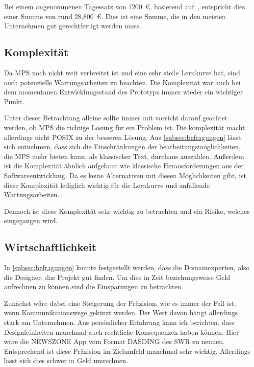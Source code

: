Bei einem angenommenen Tagessatz von 1200~\euro, basierend auf~\cite{metrics-germany-gmbh-2021}, entspricht dies einer Summe von rund 28,800~\euro.
Dies ist eine Summe, die in den meisten Unternehmen gut gerechtfertigt werden muss.

\subsection{Komplexität}\label{subsec:komplexitat}
Da \ac{MPS} noch nicht weit verbreitet ist und eine sehr steile Lernkurve hat, sind auch potenzielle Wartungsarbeiten zu beachten.
Die Komplexität war auch bei dem momentanen Entwicklungsstand des Prototyps immer wieder ein wichtiger Punkt.

Unter dieser Betrachtung alleine sollte immer mit vorsicht darauf geachtet werden, ob \ac{MPS} die richtige Lösung für ein Problem ist.
Die komplexität macht allerdings nicht \ac{POSIX} zu der besseren Lösung.
Aus \autoref{subsec:befragungen} lässt sich entnehmen, dass sich die Einschränkungen der bearbeitungsmöglichkeiten, die \ac{MPS} mehr bieten kann, als klassischer Text, durchaus auszahlen.
Außerdem ist die Komplexität ähnlich aufgebaut wie klassische Herausforderungen aus der Softwareentwicklung.
Da es keine Alternativen mit diesen Möglichkeiten gibt, ist diese Komplexität lediglich wichtig für die Lernkurve und anfallende Wartungsarbeiten.

Dennoch ist diese Komplexität sehr wichtig zu betrachten und ein Risiko, welches eingegangen wird.

\subsection{Wirtschaftlichkeit}\label{subsec:wirtschaftlichkeit}
In \autoref{subsec:befragungen} konnte festgestellt werden, dass die Domainexperten, also die Designer, das Projekt gut finden.
Um dies in Zeit beziehungsweise Geld aufrechnen zu können sind die Einsparungen zu betrachten.

Zunächst wäre dabei eine Steigerung der Präzision, wie es immer der Fall ist, wenn Kommunikationswege gekürzt werden.
Der Wert davon hängt allerdings stark am Unternehmen.
Aus persönlicher Erfahrung kann ich berichten, dass Designfeinheiten manchmal auch rechtliche Konsequenzen haben können.
Hier wäre die NEWSZONE App vom Format DASDING des \ac{SWR} zu nennen.
Entsprechend ist diese Präzision im Zielumfeld manchmal sehr wichtig.
Allerdings lässt sich dies schwer in Geld umrechnen.


